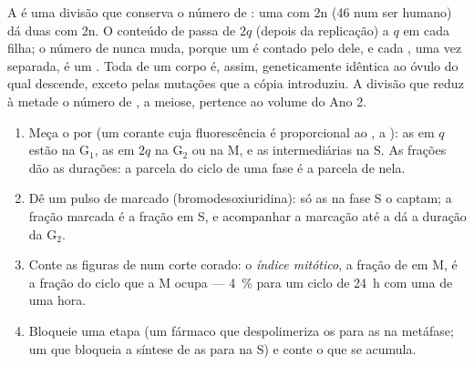 \begin{proposition}\label{prop:b1:replication-mitosis:conserves}
A  é uma divisão que conserva o número de : uma 
com 2n  (46 num ser humano) dá duas  com 2n. O
conteúdo de  passa de $2q$ (depois da replicação) a $q$ em cada
filha; o número de  nunca muda, porque um  é
contado pelo  dele, e cada , uma vez separada, é um
. Toda  de um corpo é, assim, geneticamente idêntica ao
óvulo do qual descende, exceto pelas mutações que a cópia introduziu. A
divisão que reduz à metade o número de , a meiose, pertence
ao volume do Ano 2.
\end{proposition}

\begin{method}\label{met:b1:replication-mitosis:reading}
\begin{enumerate}
  \item Meça o  por  (um corante cuja fluorescência é
        proporcional ao ,  a ): as  em $q$ estão
        na G$_1$, as em $2q$ na G$_2$ ou na M, e as intermediárias na S.
        As frações dão as durações: a parcela do ciclo de uma fase é a
        parcela de  nela.
  \item Dê um pulso de  marcado (bromodesoxiuridina): só as
         na fase S o captam; a fração marcada é a fração em S, e
        acompanhar a marcação até a  dá a duração da G$_2$.
  \item Conte as figuras de  num corte corado: o
        \emph{índice mitótico}, a fração de  em M, é a fração do
        ciclo que a M ocupa --- \qty{4}{\%} para um ciclo de \qty{24}{h}
        com uma  de uma hora.
  \item Bloqueie uma etapa (um fármaco que despolimeriza os
         para as  na metáfase; um que bloqueia a
        síntese de  as para na S) e conte o que se acumula.
\end{enumerate}
\end{method}

